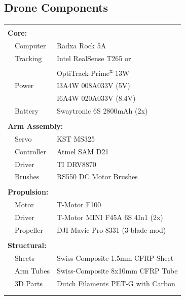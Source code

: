 \documentclass[conference]{IEEEtran}
\begin{document}
\subsection{Drone Components}
\begin{tabular}{ l l l }
	\hline
	&&\\[-8pt] \multicolumn{3}{l}{\textbf{Core:}} \\
	& Computer & Radxa Rock 5A \\
	& Tracking & Intel RealSense T265 or\\
	&& OptiTrack Prime\textsuperscript{x} 13W \\
	& Power & I3A4W 008A033V (5V)\\
	&& I6A4W 020A033V (8.4V)\\
	& Battery & Swaytronic 6S 2800mAh (2x) \\
	&&\\[-8pt] \multicolumn{3}{l}{\textbf{Arm Assembly:}} \\
	& Servo & KST MS325 \\
	& Controller & Atmel SAM D21 \\
	& Driver & TI DRV8870 \\
	& Brushes & RS550 DC Motor Brushes \\
	&&\\[-8pt] \multicolumn{3}{l}{\textbf{Propulsion:}} \\
	& Motor & T-Motor F100 \\
	& Driver & T-Motor MINI F45A 6S 4In1 (2x)\\
	& Propeller & DJI Mavic Pro 8331 (3-blade-mod)\\
	&&\\[-8pt] \multicolumn{3}{l}{\textbf{Structural:}} \\
	& Sheets & Swiss-Composite 1.5mm CFRP Sheet \\
	& Arm Tubes & Swiss-Composite 8x10mm CFRP Tube \\
	& 3D Parts & Dutch Filaments PET-G with Carbon \\
	&&\\[-8pt] \hline &&\\
\end{tabular}
\vspace{8pt}
\end{document}
